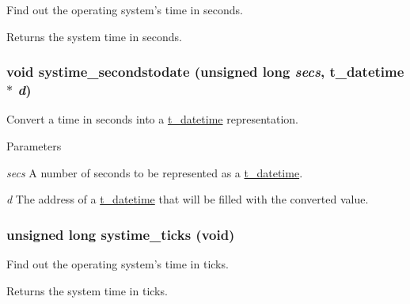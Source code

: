 Find out the operating system’s time in seconds. \begin{DoxyReturn}{Returns}
the system time in seconds. 
\end{DoxyReturn}
\hypertarget{group__systime_gac7e909e02efabd823ce226a3234d700b}{
\subsubsection[{systime\_\-secondstodate}]{\setlength{\rightskip}{0pt plus 5cm}void systime\_\-secondstodate (unsigned long {\em secs}, \/  {\bf t\_\-datetime} $\ast$ {\em d})}}
\label{group__systime_gac7e909e02efabd823ce226a3234d700b}


Convert a time in seconds into a \hyperlink{structt__datetime}{t\_\-datetime} representation. 
\begin{DoxyParams}{Parameters}
\item[{\em secs}]A number of seconds to be represented as a \hyperlink{structt__datetime}{t\_\-datetime}. \item[{\em d}]The address of a \hyperlink{structt__datetime}{t\_\-datetime} that will be filled with the converted value. \end{DoxyParams}
\hypertarget{group__systime_gaa7831fc0634782a0ba07b44f47be8e61}{
\subsubsection[{systime\_\-ticks}]{\setlength{\rightskip}{0pt plus 5cm}unsigned long systime\_\-ticks (void)}}
\label{group__systime_gaa7831fc0634782a0ba07b44f47be8e61}


Find out the operating system’s time in ticks. \begin{DoxyReturn}{Returns}
the system time in ticks. 
\end{DoxyReturn}
